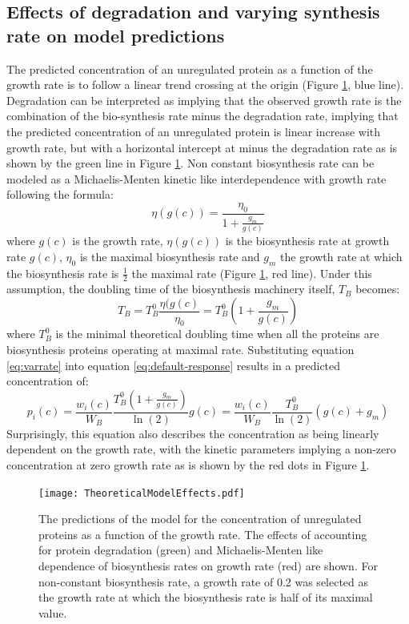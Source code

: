 \documentclass[a4paper]{article}
\begin{document}
\subsection{Effects of degradation and varying synthesis rate on model predictions}
\label{theoreticalintercep}
The predicted concentration of an unregulated protein as a function of the growth rate is to follow a linear trend crossing at the origin (Figure \ref{fig:theoreticalpred}, blue line).
Degradation can be interpreted as implying that the observed growth rate is the combination of the bio-synthesis rate minus the degradation rate, implying that the predicted concentration of an unregulated protein is linear increase with growth rate, but with a horizontal intercept at minus the degradation rate as is shown by the green line in Figure \ref{fig:theoreticalpred}.
Non constant biosynthesis rate can be modeled as a Michaelis-Menten kinetic like interdependence with growth rate following the formula:
\begin{equation}
\eta(g(c))=\frac{\eta_0}{1+\frac{g_m}{g(c)}}
\end{equation}
where $g(c)$ is the growth rate, $\eta(g(c))$ is the biosynthesis rate at growth rate $g(c)$, $\eta_0$ is the maximal biosynthesis rate and $g_m$ the growth rate at which the biosynthesis rate is $\frac{1}{2}$ the maximal rate (Figure \ref{fig:theoreticalpred}, red line).
Under this assumption, the doubling time of the biosynthesis machinery itself, $T_B$ becomes:
\begin{equation}
\label{eq:varrate}
T_B=T_B^0\frac{\eta(g(c)}{\eta_0}=T_B^0(1+\frac{g_m}{g(c)})
\end{equation}
where $T_B^0$ is the minimal theoretical doubling time when all the proteins are biosynthesis proteins operating at maximal rate.
Substituting equation \ref{eq:varrate} into equation \ref{eq:default-response} results in a predicted concentration of:
\begin{equation}
p_i(c)=\frac{w_i(c)}{W_B}\frac{T_B^0(1+\frac{g_m}{g(c)})}{\ln(2)}g(c) = \frac{w_i(c)}{W_B}\frac{T_B^0}{\ln(2)}(g(c)+g_m)
\end{equation}
Surprisingly, this equation also describes the concentration as being linearly dependent on the growth rate, with the kinetic parameters implying a non-zero concentration at zero growth rate as is shown by the red dots in Figure \ref{fig:theoreticalpred}.


\begin{figure}[H]
\begin{center}
\texttt{[image: TheoreticalModelEffects.pdf]}
\caption{\label{fig:theoreticalpred}
The predictions of the model for the concentration of unregulated proteins as a function of the growth rate.
The effects of accounting for protein degradation (green) and Michaelis-Menten like dependence of biosynthesis rates on growth rate (red) are shown.
For non-constant biosynthesis rate, a growth rate of 0.2 was selected as the growth rate at which the biosynthesis rate is half of its maximal value.%
}
\end{center}
\end{figure}
\end{document}
